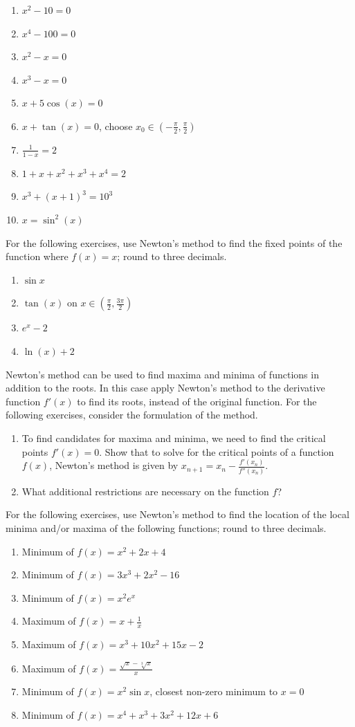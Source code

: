 \documentclass{exercises}
\begin{document}
\begin{enumerate}[resume]
\item $x^{2}-10=0$
\item $x^{4}-100=0$
\item $x^{2}-x=0$
\item $x^{3}-x=0$
\item $x+5\cos(x)=0$
\item $x+\tan(x)=0$, choose $x_{0}\in(-\frac{\pi}{2},\frac{\pi}{2})$
\item $\frac{1}{1-x}=2$
\item $1+x+x^{2}+x^{3}+x^{4}=2$
\item $x^{3}+(x+1)^{3}=10^{3}$
\item $x=\sin^{2}(x)$
\end{enumerate}

For the following exercises, use Newton's method to find the fixed points of the function where $f(x)=x$; round to three decimals.

\begin{enumerate}[resume]
\item $\sin x$
\item $\tan(x)$ on $x\in(\frac{\pi}{2},\frac{3\pi}{2})$
\item $e^{x}-2$
\item $\ln(x)+2$
\end{enumerate}

Newton's method can be used to find maxima and minima of functions in addition to the roots. In this case apply Newton's method to the derivative function $f'(x)$ to find its roots, instead of the original function. For the following exercises, consider the formulation of the method.

\begin{enumerate}[resume]
\item To find candidates for maxima and minima, we need to find the critical points $f'(x)=0$. Show that to solve for the critical points of a function $f(x)$, Newton's method is given by $x_{n+1}=x_{n}-\frac{f'(x_{n})}{f''(x_{n})}$.
\item What additional restrictions are necessary on the function $f$?
\end{enumerate}

For the following exercises, use Newton's method to find the location of the local minima and/or maxima of the following functions; round to three decimals.

\begin{enumerate}[resume]
\item Minimum of $f(x)=x^{2}+2x+4$
\item Minimum of $f(x)=3x^{3}+2x^{2}-16$
\item Minimum of $f(x)=x^{2}e^{x}$
\item Maximum of $f(x)=x+\frac{1}{x}$
\item Maximum of $f(x)=x^{3}+10x^{2}+15x-2$
\item Maximum of $f(x)=\frac{\sqrt{x}-\sqrt[3]{x}}{x}$
\item Minimum of $f(x)=x^{2}\sin x$, closest non-zero minimum to $x=0$
\item Minimum of $f(x)=x^{4}+x^{3}+3x^{2}+12x+6$
\end{enumerate}
\end{document}
